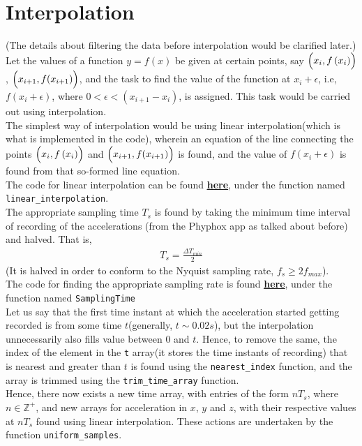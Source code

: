 \documentclass[oneside]{book}
\begin{document}
\chapter{Interpolation}
(The details about filtering the data before interpolation would be clarified later.)\\
Let the values of a function $y = f(x)$ be given at certain points, say $\Bigl(x_i,f\left(x_i\right)\Bigr)$, $\Bigl(x_{i+1}, f(x_{i+1})\Bigr)$, and the task to find the value of the function at $x_i + \epsilon$, i.e,\\ $f(x_i + \epsilon)$, where $0<\epsilon < (x_{i+1} - x_i)$, is assigned. This task would be carried out using interpolation. \\
\bigskip
The simplest way of interpolation would be using linear interpolation(which is what is implemented in the code), wherein an equation of the line connecting the points $\Bigl(x_i,f\left(x_i\right)\Bigr)$ and $\Bigl(x_{i+1}, f(x_{i+1})\Bigr)$ is found, and the value of $f(x_i + \epsilon)$ is found from that so-formed line equation.\\
\bigskip
The code for linear interpolation can be found \href{https://github.com/HarryNyquist/Odometry/blob/main/Codes/2_DataFunctions.cpp}{\underline{\textbf{here}}}, under the function named \verb|linear_interpolation|.\\
\bigskip
The appropriate sampling time $T_s$ is found by taking the minimum time interval of recording of the accelerations (from the Phyphox app as talked about before) and halved. That is,
\begin{align}
    T_s = \frac{\Delta T_{min}}{2}
\end{align}
(It is halved in order to conform to the Nyquist sampling rate, $f_s \geq 2f_{max}$). \\
The code for finding the appropriate sampling rate is found \href{https://github.com/HarryNyquist/Odometry/blob/main/Codes/2_DataFunctions.cpp}{\underline{\textbf{here}}}, under the function named \verb|SamplingTime| \\
\bigskip
Let us say that the first time instant at which the acceleration started getting recorded is from some time $t$(generally, $t \sim 0.02s$), but the interpolation unnecessarily also fills value between 0 and $t$. Hence, to remove the same, the index of the element in the \verb|t| array(it stores the time instants of recording) that is nearest and greater than $t$ is found using the \verb|nearest_index| function, and the array is trimmed using the \verb|trim_time_array| function. \\
\bigskip
Hence, there now exists a new time array, with entries of the form $nT_s$, where $n \in \mathbb{Z}^+$, and new arrays for acceleration in $x$, $y$ and $z$, with their respective values at $nT_s$ found using linear interpolation. These actions are undertaken by the function \verb|uniform_samples|. \\
\end{document}
